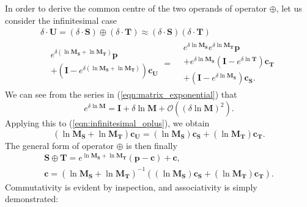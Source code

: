         In order to derive the common centre of the two operands of operator $\oplus$, let us consider the infinitesimal case
        \begin{gather}
          \delta \cdot \mathbf{U} = (\delta \cdot \mathbf{S}) \oplus (\delta \cdot \mathbf{T}) \approx (\delta \cdot \mathbf{S}) (\delta \cdot \mathbf{T}) \\
          \begin{aligned}
            &e^{\delta(\ln \mathbf{M_S} + \ln \mathbf{M_T})}\mathbf{p} \\
            &+ (\mathbf{I} - e^{\delta(\ln \mathbf{M_S} + \ln \mathbf{M_T})})\mathbf{c_U}
          \end{aligned} = \begin{aligned}
              &e^{\delta \ln \mathbf{M_S}}e^{\delta \ln \mathbf{M_T}}\mathbf{p} \\
              &+ e^{\delta \ln \mathbf{M_S}}(\mathbf{I} - e^{\delta \ln \mathbf{T}})\mathbf{c_T} \\
              &+ (\mathbf{I} - e^{\delta \ln \mathbf{M_S}})\mathbf{c_S}. \label{eqn:infinitesimal_oplus}
          \end{aligned}
        \end{gather}
        We can see from the series in (\ref{eqn:matrix_exponential}) that
        \begin{equation}
          e^{\delta \ln \mathbf{M}} = \mathbf{I} + \delta \ln \mathbf{M} + \mathcal{O}((\delta \ln \mathbf{M})^2).
        \end{equation}
        Applying this to (\ref{eqn:infinitesimal_oplus}), we obtain
        \begin{equation}
          (\ln\mathbf{M_S} + \ln\mathbf{M_T})\mathbf{c_U} = (\ln\mathbf{M_S})\mathbf{c_S} + (\ln\mathbf{M_T})\mathbf{c_T}.
        \end{equation}
        The general form of operator $\oplus$ is then finally
        \begin{gather}
          \mathbf{S} \oplus \mathbf{T} = e^{\ln\mathbf{M_S} + \ln\mathbf{M_T}}(\mathbf{p} - \mathbf{c}) + \mathbf{c}, \nonumber \\
          \mathbf{c} = (\ln\mathbf{M_S} + \ln\mathbf{M_T})^{-1}((\ln\mathbf{M_S})\mathbf{c_S} + (\ln\mathbf{M_T})\mathbf{c_T}). \label{eqn:affine_oplus}
        \end{gather}
        Commutativity is evident by inspection, and associativity is simply demonstrated:
